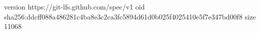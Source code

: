 version https://git-lfs.github.com/spec/v1
oid sha256:ddcff088a486281c4ba8e3c2ca3fc5894d61d0b025f4025410e5f7e347bd00f8
size 11068
